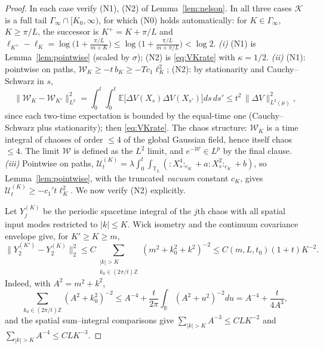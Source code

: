 \documentclass[11pt,a4paper]{article}
\theoremstyle{plain}
\theoremstyle{definition}
\newcommand{\R}{\mathbb{R}}
\newcommand{\Z}{\mathbb{Z}}
\newcommand{\T}{\mathbb{T}}
\newcommand{\E}{\mathbb{E}}
\newcommand{\U}{\mathcal U}
\newcommand{\muv}{\mu}
\begin{document}
\begin{proof}
In each case verify (N1), (N2) of Lemma~\ref{lem:nelson}.
In all three cases $\mathcal K$ is a full tail
$\Gamma_\infty\cap[K_0,\infty)$, for which (N0) holds automatically: for
$K\in\Gamma_\infty$, $K\ge\pi/L$, the successor is $K^+=K+\pi/L$ and
$\ell_{K^+}-\ell_K=\log\bigl(1+\tfrac{\pi/L}{m+K}\bigr)
\le\log\bigl(1+\tfrac{\pi/L}{m+\pi/L}\bigr)<\log2$.
\emph{(i)} (N1) is Lemma~\ref{lem:pointwise} (scaled by $\sigma$); (N2)
is \eqref{eq:VKrate} with $\kappa=1/2$.
\emph{(ii)} (N1): pointwise on paths,
$\mathcal W_K\ge-t\,b_K\ge-Tc_1\ell_K^2$; (N2): by stationarity and
Cauchy--Schwarz in $s$,
\[
 \|\mathcal W_K-\mathcal W_{K'}\|_{L^2}^2
 =\int_0^t\!\!\int_0^t\E\bigl[\Delta V(X_s)\Delta V(X_{s'})\bigr]ds\,ds'
 \le t^2\,\|\Delta V\|_{L^2(\muv)}^2 ,
\]
since each two-time expectation is bounded by the equal-time one
(Cauchy--Schwarz plus stationarity); then \eqref{eq:VKrate}. The chaos
structure: $\mathcal W_K$ is a time integral of chaoses of order $\le4$
of the global Gaussian field, hence itself chaos $\le4$. The limit
$\mathcal W$ is defined as the $L^2$ limit, and $e^{-\mathcal W}\in L^p$
by the final clause.
\emph{(iii)} Pointwise on paths,
$\U^{(K)}_t=\lambda\int_0^t\!\!\int_{\T_L}
({:}X_s^4{:}_{c_K}+a{:}X_s^2{:}_{c_K}+b)$, so
Lemma~\ref{lem:pointwise}, with the truncated \emph{vacuum} constant $c_K$,
gives $\U^{(K)}_t\ge-c_1't\ell_K^2$.  We now verify (N2) explicitly.

Let $Y_j^{(K)}$ be the periodic spacetime integral of the $j$th chaos with
all spatial input modes restricted to $|k|\le K$.  Wick isometry and the
continuum covariance envelope give, for $K'\ge K\ge m$,
\begin{equation}
 \|Y_2^{(K')}-Y_2^{(K)}\|_2^2
 \le C\sum_{\substack{|k|>K\\k_0\in(2\pi/t)\Z}}
       (m^2+k_0^2+k^2)^{-2}
 \le C(m,L,t_0)(1+t)K^{-2}.                                      \label{eq:perY2tail}
\end{equation}
Indeed, with $A^2=m^2+k^2$,
\[
 \sum_{k_0\in(2\pi/t)\Z}(A^2+k_0^2)^{-2}
 \le A^{-4}+\frac{t}{2\pi}\int_\R(A^2+u^2)^{-2}du
 =A^{-4}+\frac{t}{4A^3},
\]
and the spatial sum--integral comparisons give
$\sum_{|k|>K}A^{-3}\le C L K^{-2}$ and
$\sum_{|k|>K}A^{-4}\le C L K^{-3}$.


\end{proof}
\end{document}

